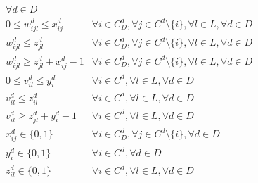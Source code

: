 \documentclass[11pt,twoside]{article}
\numberwithin{Theorem}{section}
\numberwithin{Definition}{section}
\numberwithin{Lemma}{section}
\numberwithin{Algorithm}{section}
\numberwithin{equation}{section}
\begin{document}
\begin{align}
	& \forall d \in D \label{soloTolerance}\\
	& 0 \leq w_{ijl}^d \leq x_{ij}^d
	& \forall i \in C_D^d, \forall j \in C^d \setminus \{i\}, \forall l \in L, \forall d \in D \label{wLin1} \\
	& w_{ijl}^d \leq z_{jl}^d
	& \forall i \in C_D^d, \forall j \in C^d \setminus \{i\}, \forall l \in L, \forall d \in D \label{wLin3} \\
	& w_{ijl}^d \geq z_{jl}^d + x_{ij}^d - 1
	& \forall i \in C_D^d, \forall j \in C^d \setminus \{i\}, \forall l \in L, \forall d \in D \label{wLin4} \\
	& 0 \leq v_{il}^d \leq y_{i}^d
	& \forall i \in C^d, \forall l \in L, \forall d \in D \label{vLin1} \\
	& v_{il}^d \leq z_{il}^d
	& \forall i \in C^d, \forall l \in L, \forall d \in D \label{vLin3} \\
	& v_{il}^d \geq z_{jl}^d + y_{i}^d - 1
	& \forall i \in C^d, \forall l \in L, \forall d \in D \label{vLin4} \\
	& x_{ij}^d \in \{0,1\}
	& \forall i \in C_D^d, \forall j \in C^d \setminus \{i\}, \forall d \in D \label{domX} \\
	& y_i^d \in \{0,1\}
	& \forall i \in C^d, \forall d \in D \label{domY} \\
	& z_{il}^d \in \{0,1\}
	& \forall i \in C^d, \forall l \in L, \forall d \in D \label{domZ}
\end{align}
\end{document}
